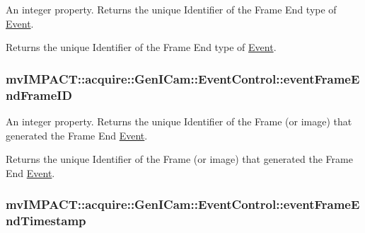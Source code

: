 An integer property. Returns the unique Identifier of the Frame End type of \hyperlink{classmv_i_m_p_a_c_t_1_1acquire_1_1_event}{Event}. 

Returns the unique Identifier of the Frame End type of \hyperlink{classmv_i_m_p_a_c_t_1_1acquire_1_1_event}{Event}. \hypertarget{classmv_i_m_p_a_c_t_1_1acquire_1_1_gen_i_cam_1_1_event_control_a24faf4ecd22c86df6fb1e006569d1de5}{
\subsubsection[{event\+Frame\+End\+Frame\+I\+D}]{ mv\+I\+M\+P\+A\+C\+T\+::acquire\+::\+Gen\+I\+Cam\+::\+Event\+Control\+::event\+Frame\+End\+Frame\+I\+D}}\label{classmv_i_m_p_a_c_t_1_1acquire_1_1_gen_i_cam_1_1_event_control_a24faf4ecd22c86df6fb1e006569d1de5}


An integer property. Returns the unique Identifier of the Frame (or image) that generated the Frame End \hyperlink{classmv_i_m_p_a_c_t_1_1acquire_1_1_event}{Event}. 

Returns the unique Identifier of the Frame (or image) that generated the Frame End \hyperlink{classmv_i_m_p_a_c_t_1_1acquire_1_1_event}{Event}. \hypertarget{classmv_i_m_p_a_c_t_1_1acquire_1_1_gen_i_cam_1_1_event_control_aa416f99690b9cf4f4cc07fc5682eb76f}{
\subsubsection[{event\+Frame\+End\+Timestamp}]{ mv\+I\+M\+P\+A\+C\+T\+::acquire\+::\+Gen\+I\+Cam\+::\+Event\+Control\+::event\+Frame\+End\+Timestamp}}\label{classmv_i_m_p_a_c_t_1_1acquire_1_1_gen_i_cam_1_1_event_control_aa416f99690b9cf4f4cc07fc5682eb76f}



